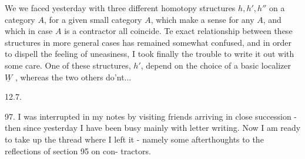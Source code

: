 
We we faced yesterday with three different homotopy structures
$h,h',h''$ on a category $A\hat{}$, for a given small category $A$, which make
a sense for any $A$, and which in case $A$ is a contractor all coincide.
Te exact relationship between these structures in more general cases
has remained somewhat confused, and in order to dispell the 
feeling of uneasiness, I took finally the trouble  to write it out with
some care. One of these structures, $h'$, depend on the choice of a
basic localizer $\underline{W}$ , whereas the two others do'nt... 

12.7.

97. I was interrupted in my notes by visiting friends arriving in
close succession - then since yesterday I have been busy mainly with
letter writing. Now I am ready to take up the thread where I left it
- namely some afterthoughts to the reflections of section 95 on con-%
tractors.

